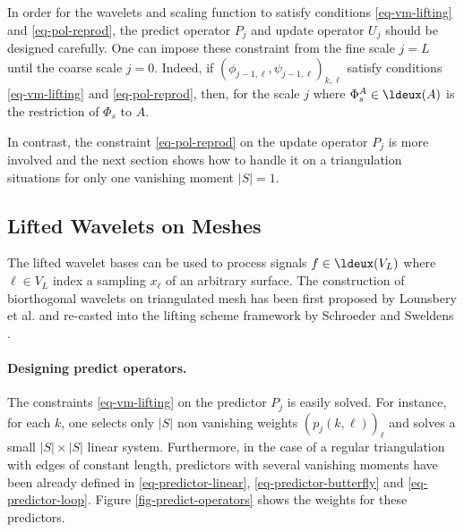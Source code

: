 In order for the wavelets and scaling function to satisfy conditions \eqref{eq-vm-lifting} and \eqref{eq-pol-reprod}, the predict operator $P_j$ and update operator $U_j$ should be designed carefully. One can impose these constraint from the fine scale $j=L$ until the coarse scale $j=0$. Indeed, if $(\phi_{j-1,\ell},\psi_{j-1,\ell})_{k,\ell}$ satisfy conditions \eqref{eq-vm-lifting} and \eqref{eq-pol-reprod}, then, for the scale $j$
where $\Phi_s^A \in \ldeux(A)$  is the restriction of $\Phi_s$ to $A$.


In contrast, the constraint \eqref{eq-pol-reprod} on the update operator $P_j$ is more involved and the next section shows how to handle it on a triangulation situations for only one vanishing moment $|S|=1$. 

\subsection{Lifted Wavelets on Meshes}

The lifted wavelet bases can be used to process signals $f \in \ldeux(V_L)$ where $\ell \in V_L$ index a sampling $x_\ell$ of an arbitrary surface. The construction of biorthogonal wavelets on triangulated mesh has been first proposed by Lounsbery et al. \cite{lounsbery-multires} and re-casted into the lifting scheme framework by Schroeder and Sweldens \cite{shroder-spherical-wavelets,schroder-spherical-wav-texture}.

\paragraph{Designing predict operators.}

The constraints \eqref{eq-vm-lifting} on the predictor $P_j$ is easily solved. For instance, for each $k$, one selects only $|S|$ non vanishing weights $(p_j(k,\ell))_\ell$ and solves a small $|S| \times |S|$ linear system. Furthermore, in the case of a regular triangulation with edges of constant length, predictors with several vanishing moments have been already defined in \eqref{eq-predictor-linear}, \eqref{eq-predictor-butterfly} and \eqref{eq-predictor-loop}. Figure \ref{fig-predict-operators} shows the weights for these predictors.

